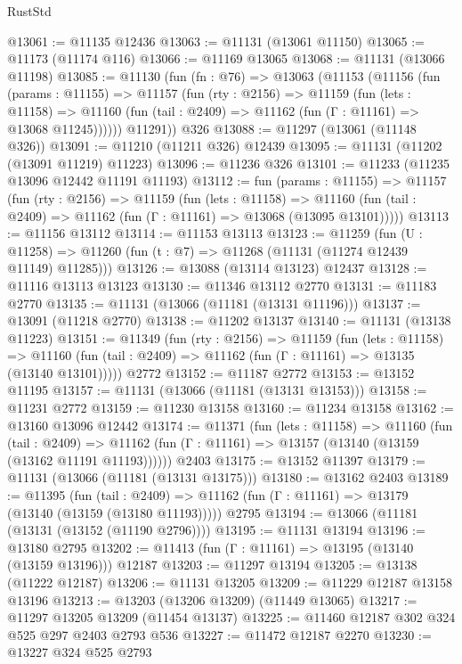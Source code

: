 \begin{lexlean}{RustStd}
\begin{coremodule}
@13061 := @11135 @12436
@13063 := @11131 (@13061 @11150)
@13065 := @11173 (@11174 @116)
@13066 := @11169 @13065
@13068 := @11131 (@13066 @11198)
@13085 := @11130
    (fun (fn : @76) =>
    @13063
      (@11153
        (@11156
          (fun (params : @11155) =>
          @11157
            (fun (rty : @2156) =>
            @11159
              (fun (lets : @11158) =>
              @11160 (fun (tail : @2409) => @11162 (fun (Γ : @11161) => @13068 @11245))))))
        @11291))
    @326
@13088 := @11297 (@13061 (@11148 @326))
@13091 := @11210 (@11211 @326) @12439
@13095 := @11131 (@11202 (@13091 @11219) @11223)
@13096 := @11236 @326
@13101 := @11233 (@11235 @13096 @12442 @11191 @11193)
@13112 := fun (params : @11155) =>
  @11157
    (fun (rty : @2156) =>
    @11159
      (fun (lets : @11158) =>
      @11160 (fun (tail : @2409) => @11162 (fun (Γ : @11161) => @13068 (@13095 @13101)))))
@13113 := @11156 @13112
@13114 := @11153 @13113
@13123 := @11259
    (fun (U : @11258) => @11260 (fun (t : @7) => @11268 (@11131 (@11274 @12439 @11149) @11285)))
@13126 := @13088 (@13114 @13123) @12437
@13128 := @11116 @13113 @13123
@13130 := @11346 @13112 @2770
@13131 := @11183 @2770
@13135 := @11131 (@13066 (@11181 (@13131 @11196)))
@13137 := @13091 (@11218 @2770)
@13138 := @11202 @13137
@13140 := @11131 (@13138 @11223)
@13151 := @11349
    (fun (rty : @2156) =>
    @11159
      (fun (lets : @11158) =>
      @11160 (fun (tail : @2409) => @11162 (fun (Γ : @11161) => @13135 (@13140 @13101)))))
    @2772
@13152 := @11187 @2772
@13153 := @13152 @11195
@13157 := @11131 (@13066 (@11181 (@13131 @13153)))
@13158 := @11231 @2772
@13159 := @11230 @13158
@13160 := @11234 @13158
@13162 := @13160 @13096 @12442
@13174 := @11371
    (fun (lets : @11158) =>
    @11160
      (fun (tail : @2409) =>
      @11162 (fun (Γ : @11161) => @13157 (@13140 (@13159 (@13162 @11191 @11193))))))
    @2403
@13175 := @13152 @11397
@13179 := @11131 (@13066 (@11181 (@13131 @13175)))
@13180 := @13162 @2403
@13189 := @11395
    (fun (tail : @2409) => @11162 (fun (Γ : @11161) => @13179 (@13140 (@13159 (@13180 @11193)))))
    @2795
@13194 := @13066 (@11181 (@13131 (@13152 (@11190 @2796))))
@13195 := @11131 @13194
@13196 := @13180 @2795
@13202 := @11413 (fun (Γ : @11161) => @13195 (@13140 (@13159 @13196))) @12187
@13203 := @11297 @13194
@13205 := @13138 (@11222 @12187)
@13206 := @11131 @13205
@13209 := @11229 @12187 @13158 @13196
@13213 := @13203 (@13206 @13209) (@11449 @13065)
@13217 := @11297 @13205 @13209 (@11454 @13137)
@13225 := @11460 @12187 @302 @324 @525 @297 @2403 @2793 @536
@13227 := @11472 @12187 @2270
@13230 := @13227 @324 @525 @2793

\end{coremodule}
\end{lexlean}
